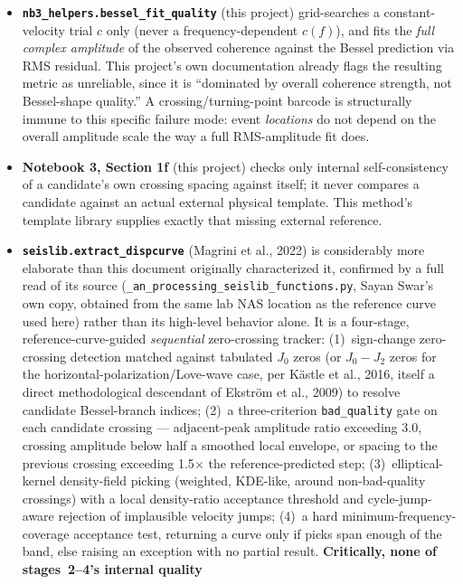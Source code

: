 \documentclass[11pt]{article}
\begin{document}
\begin{itemize}
  \item \textbf{\texttt{nb3\_helpers.bessel\_fit\_quality}} (this project) grid-searches a
    constant-velocity trial $c$ only (never a frequency-dependent $c(f)$), and fits the
    \emph{full complex amplitude} of the observed coherence against the Bessel prediction via RMS
    residual. This project's own documentation already flags the resulting metric as unreliable,
    since it is ``dominated by overall coherence strength, not Bessel-shape quality.'' A
    crossing/turning-point barcode is structurally immune to this specific failure mode: event
    \emph{locations} do not depend on the overall amplitude scale the way a full RMS-amplitude
    fit does.
  \item \textbf{Notebook 3, Section 1f} (this project) checks only internal self-consistency of a
    candidate's own crossing spacing against itself; it never compares a candidate against an
    actual external physical template. This method's template library supplies exactly that
    missing external reference.
  \item \textbf{\texttt{seislib.extract\_dispcurve}} (Magrini et al., 2022) is considerably more
    elaborate than this document originally characterized it, confirmed by a full read of its
    source (\texttt{\_an\_processing\_seislib\_functions.py}, Sayan Swar's own copy, obtained from
    the same lab NAS location as the reference curve used here) rather than its high-level
    behavior alone. It is a four-stage, reference-curve-guided \emph{sequential} zero-crossing
    tracker: (1)~sign-change zero-crossing detection matched against tabulated $J_0$ zeros (or
    $J_0 - J_2$ zeros for the horizontal-polarization/Love-wave case, per K\"astle et al., 2016,
    itself a direct methodological descendant of Ekstr\"om et al., 2009) to resolve candidate
    Bessel-branch indices; (2)~a three-criterion \texttt{bad\_quality} gate on each candidate
    crossing --- adjacent-peak amplitude ratio exceeding 3.0, crossing amplitude below half a
    smoothed local envelope, or spacing to the previous crossing exceeding 1.5$\times$ the
    reference-predicted step; (3)~elliptical-kernel density-field picking (weighted, KDE-like,
    around non-bad-quality crossings) with a local density-ratio acceptance threshold and
    cycle-jump-aware rejection of implausible velocity jumps; (4)~a hard minimum-frequency-coverage
    acceptance test, returning a curve only if picks span enough of the band, else raising an
    exception with no partial result. \textbf{Critically, none of stages~2--4's internal quality
}
\end{itemize}
\end{document}
